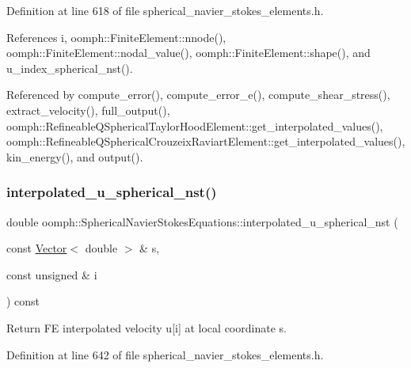 Definition at line 618 of file spherical\+\_\+navier\+\_\+stokes\+\_\+elements.\+h.



References i, oomph\+::\+Finite\+Element\+::nnode(), oomph\+::\+Finite\+Element\+::nodal\+\_\+value(), oomph\+::\+Finite\+Element\+::shape(), and u\+\_\+index\+\_\+spherical\+\_\+nst().



Referenced by compute\+\_\+error(), compute\+\_\+error\+\_\+e(), compute\+\_\+shear\+\_\+stress(), extract\+\_\+velocity(), full\+\_\+output(), oomph\+::\+Refineable\+Q\+Spherical\+Taylor\+Hood\+Element\+::get\+\_\+interpolated\+\_\+values(), oomph\+::\+Refineable\+Q\+Spherical\+Crouzeix\+Raviart\+Element\+::get\+\_\+interpolated\+\_\+values(), kin\+\_\+energy(), and output().

\mbox{\label{classoomph_1_1SphericalNavierStokesEquations_ae728a60ea2c5af4e3578e0fe9f010aff}} 
\subsubsection{\texorpdfstring{interpolated\+\_\+u\+\_\+spherical\+\_\+nst()}{interpolated\_u\_spherical\_nst()}\hspace{0.1cm}{\footnotesize\ttfamily [2/2]}}
{\footnotesize\ttfamily double oomph\+::\+Spherical\+Navier\+Stokes\+Equations\+::interpolated\+\_\+u\+\_\+spherical\+\_\+nst (\begin{DoxyParamCaption}\item[{const \hyperlink{classoomph_1_1Vector}{Vector}$<$ double $>$ \&}]{s,  }\item[{const unsigned \&}]{i }\end{DoxyParamCaption}) const\hspace{0.3cm}{\ttfamily [inline]}}



Return FE interpolated velocity u\mbox{[}i\mbox{]} at local coordinate s. 



Definition at line 642 of file spherical\+\_\+navier\+\_\+stokes\+\_\+elements.\+h.



